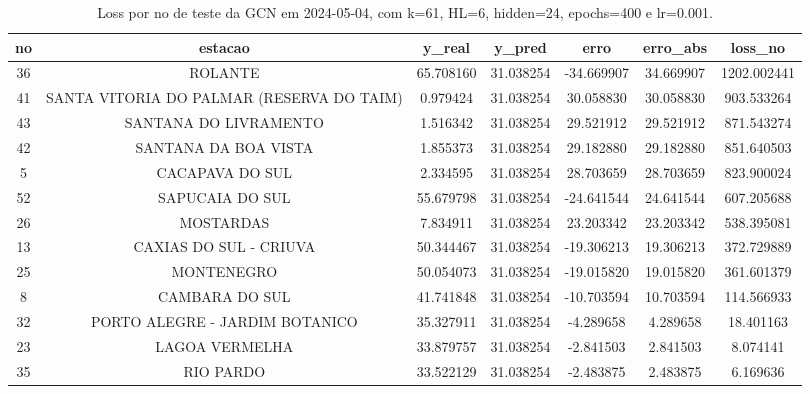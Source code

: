 \begin{table}[h]
\centering
\caption{Loss por no de teste da GCN em 2024-05-04, com k=61, HL=6, hidden=24, epochs=400 e lr=0.001.}
\label{tab:gcn_loss_k61_hl6_h24_e400_d20240504}
\begin{tabular}{ccccccc}
\toprule
no & estacao & y\_real & y\_pred & erro & erro\_abs & loss\_no \\
\midrule
36 & ROLANTE & 65.708160 & 31.038254 & -34.669907 & 34.669907 & 1202.002441 \\
41 & SANTA VITORIA DO PALMAR (RESERVA DO TAIM) & 0.979424 & 31.038254 & 30.058830 & 30.058830 & 903.533264 \\
43 & SANTANA DO LIVRAMENTO & 1.516342 & 31.038254 & 29.521912 & 29.521912 & 871.543274 \\
42 & SANTANA DA BOA VISTA & 1.855373 & 31.038254 & 29.182880 & 29.182880 & 851.640503 \\
5 & CACAPAVA DO SUL & 2.334595 & 31.038254 & 28.703659 & 28.703659 & 823.900024 \\
52 & SAPUCAIA DO SUL & 55.679798 & 31.038254 & -24.641544 & 24.641544 & 607.205688 \\
26 & MOSTARDAS & 7.834911 & 31.038254 & 23.203342 & 23.203342 & 538.395081 \\
13 & CAXIAS DO SUL - CRIUVA & 50.344467 & 31.038254 & -19.306213 & 19.306213 & 372.729889 \\
25 & MONTENEGRO & 50.054073 & 31.038254 & -19.015820 & 19.015820 & 361.601379 \\
8 & CAMBARA DO SUL & 41.741848 & 31.038254 & -10.703594 & 10.703594 & 114.566933 \\
32 & PORTO ALEGRE - JARDIM BOTANICO & 35.327911 & 31.038254 & -4.289658 & 4.289658 & 18.401163 \\
23 & LAGOA VERMELHA & 33.879757 & 31.038254 & -2.841503 & 2.841503 & 8.074141 \\
35 & RIO PARDO & 33.522129 & 31.038254 & -2.483875 & 2.483875 & 6.169636 \\
\bottomrule
\end{tabular}
\end{table}
